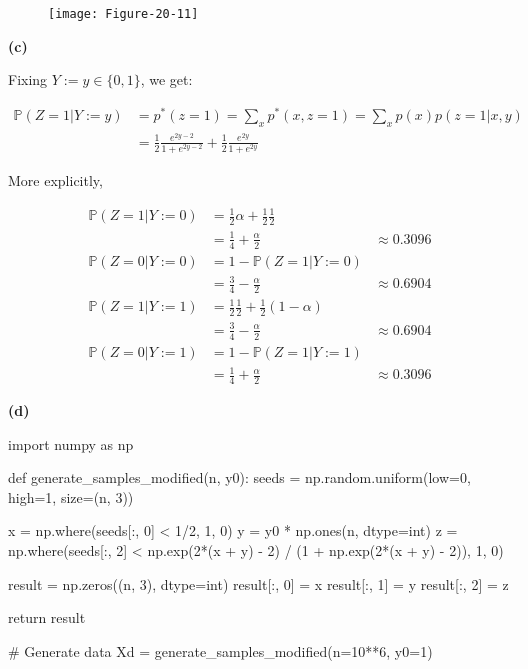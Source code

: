 \begin{figure}[H]
\centering
\texttt{[image: Figure-20-11]}
\end{figure}

\textbf{(c)}

Fixing \(Y := y \in \{0, 1\}\), we get:

\begin{align*}
\mathbb{P}(Z = 1 | Y := y) &= p^*(z = 1) = \sum_x p^*(x, z = 1) = \sum_x p(x) p(z = 1 | x, y) \\
&= \frac{1}{2} \frac{e^{2y-2}}{1 + e^{2y-2}} + \frac{1}{2} \frac{e^{2y}}{1 + e^{2y}}
\end{align*}

More explicitly,

\begin{align*}
\mathbb{P}(Z = 1 | Y := 0) &= \frac{1}{2} \alpha + \frac{1}{2}\frac{1}{2} \\
&= \frac{1}{4} + \frac{\alpha}{2} &\approx 0.3096 \\
\mathbb{P}(Z = 0 | Y := 0) &= 1 - \mathbb{P}(Z = 1 | Y := 0) \\
&= \frac{3}{4} - \frac{\alpha}{2} &\approx 0.6904 \\
\mathbb{P}(Z = 1 | Y := 1) &= \frac{1}{2} \frac{1}{2} + \frac{1}{2} \left( 1 - \alpha \right) \\
&= \frac{3}{4} - \frac{\alpha}{2} &\approx 0.6904 \\
\mathbb{P}(Z = 0 | Y := 1) &= 1 - \mathbb{P}(Z = 1 | Y := 1) \\
&= \frac{1}{4} + \frac{\alpha}{2} &\approx 0.3096
\end{align*}

\textbf{(d)}

\begin{python}
import numpy as np

def generate_samples_modified(n, y0):
    seeds = np.random.uniform(low=0, high=1, size=(n, 3))
    
    x = np.where(seeds[:, 0] < 1/2, 1, 0)
    y = y0 * np.ones(n, dtype=int)
    z = np.where(seeds[:, 2] < np.exp(2*(x + y) - 2) / (1 + np.exp(2*(x + y) - 2)), 1, 0)
    
    result = np.zeros((n, 3), dtype=int)
    result[:, 0] = x
    result[:, 1] = y
    result[:, 2] = z
    
    return result
\end{python}

\begin{python}
# Generate data
Xd = generate_samples_modified(n=10**6, y0=1)
\end{python}

